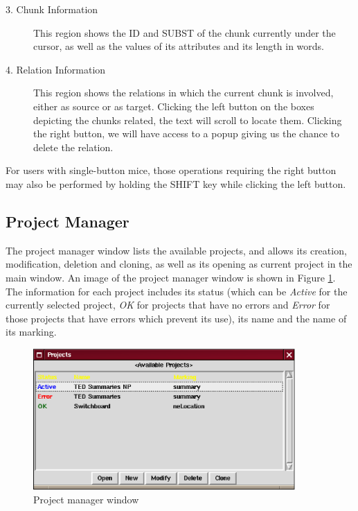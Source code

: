 \documentclass{article}
\begin{document}
\begin{description}
\item[3. Chunk Information] This region shows the ID and SUBST of the
chunk currently under the cursor, as well as the values of its
attributes and its length in words.

\item[4. Relation Information] This region shows the relations in
which the current chunk is involved, either as source or as
target. Clicking the left button on the boxes depicting the chunks
related, the text will scroll to locate them. Clicking the right
button, we will have access to a popup giving us the chance to delete
the relation.

\end{description}

For users with single-button mice, those operations requiring the
right button may also be performed by holding the SHIFT key while
clicking the left button.

\subsection{Project Manager}
\label{sec:projman}
The project manager window lists the available projects, and allows
its creation, modification, deletion and cloning, as well as its
opening as current project in the main window. An image of the project
manager window is shown in Figure \ref{fig:projectman}. The
information for each project includes its status (which can be
\emph{Active} for the currently selected project, \emph{OK} for
projects that have no errors and \emph{Error} for those projects that
have errors which prevent its use), its name and the name of its
marking.

\begin{figure}[ht]
\begin{center}

\includegraphics[width=100mm]{img/project-manager.eps}

\caption{Project manager window}
\label{fig:projectman}
\end{center}
\end{figure}
\end{document}
